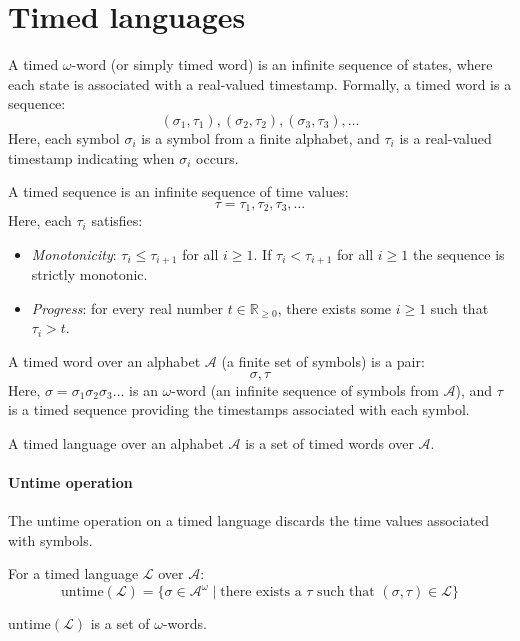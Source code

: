 \section{Timed languages}

A timed $\omega$-word (or simply timed word) is an infinite sequence of states, where each state is associated with a real-valued timestamp.
Formally, a timed word is a sequence:
\[(\sigma_1,\tau_1),(\sigma_2,\tau_2),(\sigma_3,\tau_3),\dots\]
Here, each symbol $\sigma_i$ is a symbol from a finite alphabet, and $\tau_i$ is a real-valued timestamp indicating when $\sigma_i$ occurs.
\begin{definition}
    A timed sequence is an infinite sequence of time values:
    \[\tau=\tau_1,\tau_2,\tau_3,\dots\]
    Here, each $\tau_i$ satisfies: 
    \begin{itemize}
        \item \textit{Monotonicity}: $\tau_i\leq\tau_{i+1}$ for all $i\geq 1$. 
            If $\tau_i<\tau_{i+1}$ for all $i\geq 1$ the sequence is strictly monotonic.
        \item \textit{Progress}: for every real number $t\in\mathbb{R}_{\geq 0}$, there exists some $i\geq 1$ such that $\tau_i> t$. 
    \end{itemize}
\end{definition}
\begin{definition}
    A timed word over an alphabet $\mathcal{A}$ (a finite set of symbols) is a pair:
    \[\sigma,\tau\]
    Here, $\sigma=\sigma_1\sigma_2\sigma_3\dots$ is an $\omega$-word (an infinite sequence of symbols from $\mathcal{A}$), and $\tau$ is a timed sequence providing the timestamps associated with each symbol.
\end{definition}
\begin{definition}
    A timed language over an alphabet $\mathcal{A}$ is a set of timed words over $\mathcal{A}$.
\end{definition}

\paragraph*{Untime operation}
The untime operation on a timed language discards the time values associated with symbols.

\begin{definition}
    For a timed language $\mathcal{L}$ over $\mathcal{A}$:
    \[\text{untime}(\mathcal{L}) = \{ \sigma \in \mathcal{A}^\omega \mid \text{there exists a } \tau \text{ such that } (\sigma, \tau) \in \mathcal{L} \}\]
\end{definition}
\noindent $\text{untime}(\mathcal{L})$ is a set of $\omega$-words.

